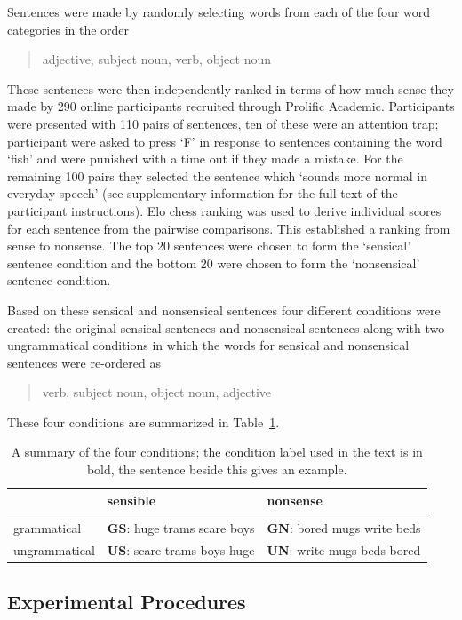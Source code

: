\documentclass[10pt,letterpaper]{article}
\begin{document}
Sentences were made by randomly selecting words from each of the four
word categories in the order 
\begin{quote}
adjective, subject noun, verb, object noun
\end{quote}
These sentences were then independently ranked in terms of how
much sense they made by 290 online participants recruited through
Prolific Academic. Participants were presented with 110 pairs of
sentences, ten of these were an attention trap; participant were asked
to press \lq{F}\rq{} in response to sentences containing the word
\lq{}fish\rq{} and were punished with a time out if they made a
mistake. For the remaining 100 pairs they selected the sentence which
\lq{}sounds more normal in everyday speech\rq{} (see supplementary
information for the full text of the participant instructions). Elo
chess ranking \cite{Elo1978} was used to derive individual scores for
each sentence from the pairwise comparisons. This established a
ranking from sense to nonsense. The top 20 sentences were chosen to form the
\lq{}sensical\rq{} sentence condition and the bottom 20 were chosen to form the \lq{}nonsensical\rq{}
sentence condition. 

Based on these sensical and nonsensical sentences four different conditions were created: the
original sensical sentences and nonsensical sentences along with two ungrammatical conditions in which the words for sensical and nonsensical sentences were re-ordered as
\begin{quote}
     verb, subject noun, object noun, adjective
\end{quote}
These four conditions are summarized in Table~\ref{tab:conditions}.

\begin{table}
\begin{tabular}{l|ll}
&sensible&nonsense\\
\hline\\
grammatical&\textbf{GS}: huge trams scare boys&\textbf{GN}: bored mugs write beds\\
ungrammatical &\textbf{US}: scare trams boys huge&\textbf{UN}: write mugs beds bored
\end{tabular}
\caption{A summary of the four conditions; the condition label used in the text is in
  bold, the sentence beside this gives an
  example.\label{tab:conditions}}
\end{table}

\subsection*{Experimental Procedures}
\end{document}
